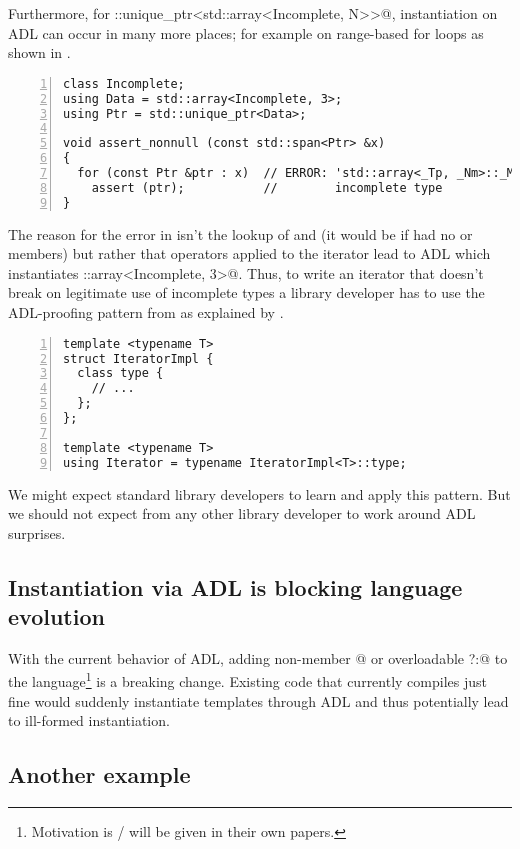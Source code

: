 Furthermore, for \codelst@std::unique_ptr<std::array<Incomplete, N>>@, instantiation on 
ADL can occur in many more places; for example on range-based for loops as shown in 
.
\begin{lstlisting}[style=Vc,numbers=left,float={hbtp},label=lst:iterating_uniqptr,caption={
Iteration over \code{std::span<std::unique_ptr<std::array<Incomplete, N>>>} is ill-formed
}]
class Incomplete;
using Data = std::array<Incomplete, 3>;
using Ptr = std::unique_ptr<Data>;

void assert_nonnull (const std::span<Ptr> &x)
{
  for (const Ptr &ptr : x)  // ERROR: 'std::array<_Tp, _Nm>::_M_elems' has
    assert (ptr);           //        incomplete type
}
\end{lstlisting}
The reason for the error in  isn't the lookup of  and 
 (it would be if  had no  or  members) but rather 
that operators applied to the iterator lead to ADL which instantiates 
\codelst@std::array<Incomplete, 3>@. Thus, to write an iterator that doesn't break on 
legitimate use of incomplete types a library developer has to use the ADL-proofing pattern 
from  as explained by \textcite{P2538R0}.
\begin{lstlisting}[style=Vc,numbers=left,float={hbtp},label=lst:adlproofediterator,caption={
ADL-proofed iterator type
}]
template <typename T>
struct IteratorImpl {
  class type {
    // ...
  };
};

template <typename T>
using Iterator = typename IteratorImpl<T>::type;
\end{lstlisting}
We might expect standard library developers to learn and apply this pattern. But we should 
not expect from any other \CC{} library developer to work around ADL surprises.

\subsection{Instantiation via ADL is blocking language evolution}\label{blocking}
With the current behavior of ADL, adding non-member \codelst@operator[]@ or overloadable 
\codelst@operator?:@ \citep{P0917R3} to the language\footnote{Motivation is / will be 
given in their own papers.} is a breaking change. Existing code that currently compiles 
just fine would suddenly instantiate templates through ADL and thus potentially lead to 
ill-formed instantiation.

\subsection{Another example}

